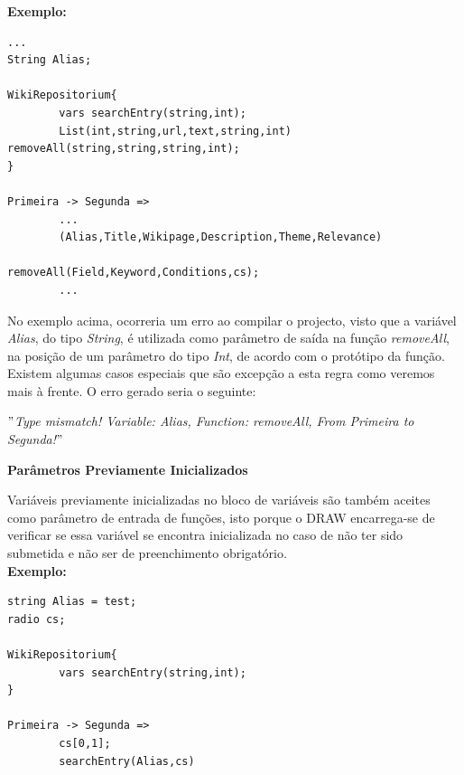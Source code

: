 \documentclass[a4paper]{article}
\begin{document}
\textbf{Exemplo:}

\begin{small}
\begin{lstlisting}
...
String Alias;

WikiRepositorium{
        vars searchEntry(string,int);
        List(int,string,url,text,string,int) removeAll(string,string,string,int);
}

Primeira -> Segunda =>
        ...
        (Alias,Title,Wikipage,Description,Theme,Relevance)
                                removeAll(Field,Keyword,Conditions,cs);
        ...
\end{lstlisting}
\end{small}

\vspace{.2cm}

No exemplo acima, ocorreria um erro ao compilar o projecto, visto que a variável \emph{Alias}, do tipo \emph{String}, é utilizada como
parâmetro de saída na função \emph{removeAll}, na posição de um parâmetro do tipo \emph{Int}, de acordo com o protótipo da função.
Existem algumas casos especiais que são excepção a esta regra como veremos mais à frente.
O erro gerado seria o seguinte:
                               
\begin{center}
\begin{small}
\emph{$"$Type mismatch! Variable: Alias, Function: removeAll, From Primeira to Segunda!$"$}
\end{small}
\end{center}

\begin{small}
\textbf{Parâmetros Previamente Inicializados}\\
\end{small}

\hspace{1cm}Variáveis previamente inicializadas no bloco de variáveis são também aceites como parâmetro de entrada de funções, isto
porque o DRAW encarrega-se de verificar se essa variável se encontra inicializada no caso de não ter sido submetida e não ser de
preenchimento obrigatório.\\

\textbf{Exemplo:}

\begin{small}
\begin{lstlisting}
string Alias = test;
radio cs;

WikiRepositorium{
        vars searchEntry(string,int);
}

Primeira -> Segunda =>
        cs[0,1];
        searchEntry(Alias,cs)
\end{lstlisting}
\end{small}
\end{document}
